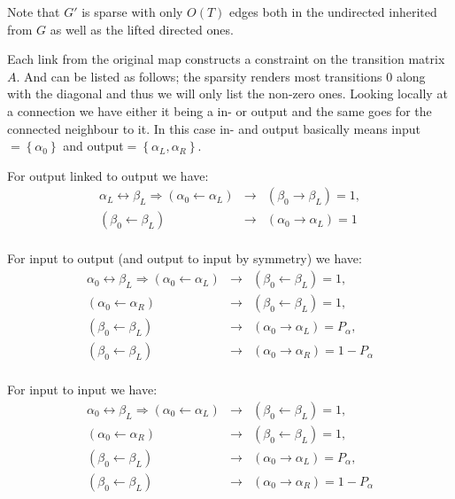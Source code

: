 \documentclass[a4paper,twoside=false,abstract=false,numbers=noenddot,
titlepage=false,headings=small,parskip=half,version=last]{scrartcl}
\begin{document}
\begin{solution}
    Note that $G'$ is sparse with only $O(T)$ edges both in the
    undirected inherited from $G$ as well as the lifted directed ones.

    Each link from the original map constructs a constraint on the transition
    matrix $A$. And can be listed as follows; the sparsity renders most
    transitions $0$ along with the diagonal and thus we will only list the
    non-zero ones.
    Looking locally at a connection we have either it being a in- or output and 
    the same goes for the connected neighbour to it. In this case in- and
    output basically means input$=\left\{\alpha_0\right\}$ and
    output$=\left\{\alpha_L,\alpha_R\right\}$.

    For output linked to output we have:
    \begin{eqnarray}
        \alpha_L\leftrightarrow\beta_L \Rightarrow 
        (\alpha_0\leftarrow\alpha_L) 
            &\rightarrow&
        (\beta_0\rightarrow\beta_L) 
        = 1,\nonumber \\
        (\beta_0\leftarrow\beta_L) 
            &\rightarrow&
        (\alpha_0\rightarrow\alpha_L) 
        = 1 \nonumber \\
    \end{eqnarray}
    
    For input to output (and output to input by symmetry) we have:
    \begin{eqnarray}
        \alpha_0\leftrightarrow\beta_L \Rightarrow 
        (\alpha_0\leftarrow\alpha_L)
            &\rightarrow&
        (\beta_0\leftarrow\beta_L) = 1, \nonumber \\
        (\alpha_0\leftarrow\alpha_R)
            &\rightarrow&
        (\beta_0\leftarrow\beta_L) = 1, \nonumber \\
        (\beta_0\leftarrow\beta_L)
            &\rightarrow&
        (\alpha_0\rightarrow\alpha_L) = P_\alpha, \nonumber \\
        (\beta_0\leftarrow\beta_L)
            &\rightarrow&
        (\alpha_0\rightarrow\alpha_R) = 1-P_\alpha \nonumber \\
    \end{eqnarray}

    For input to input we have:
    \begin{eqnarray}
        \alpha_0\leftrightarrow\beta_L \Rightarrow 
        (\alpha_0\leftarrow\alpha_L)
            &\rightarrow&
        (\beta_0\leftarrow\beta_L) = 1, \nonumber \\
        (\alpha_0\leftarrow\alpha_R)
            &\rightarrow&
        (\beta_0\leftarrow\beta_L) = 1, \nonumber \\
        (\beta_0\leftarrow\beta_L)
            &\rightarrow&
        (\alpha_0\rightarrow\alpha_L) = P_\alpha, \nonumber \\
        (\beta_0\leftarrow\beta_L)
            &\rightarrow&
        (\alpha_0\rightarrow\alpha_R) = 1-P_\alpha \nonumber \\
    \end{eqnarray}


\end{solution}
\end{document}
